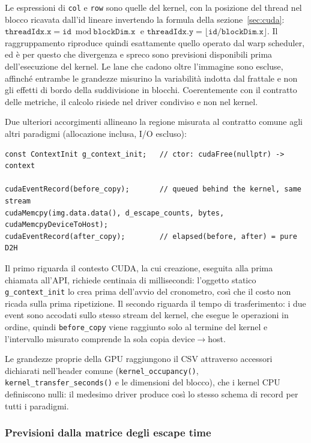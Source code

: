 Le espressioni di \texttt{col} e \texttt{row} sono quelle del kernel, con la
posizione del thread nel blocco ricavata dall'id lineare invertendo la formula
della sezione~\ref{sec:cuda}: $\texttt{threadIdx.x} = \texttt{id} \bmod
\texttt{blockDim.x}$ e $\texttt{threadIdx.y} = \lfloor \texttt{id} /
\texttt{blockDim.x} \rfloor$. Il raggruppamento riproduce quindi esattamente
quello operato dal warp scheduler, ed è per questo che divergenza e spreco sono
previsioni disponibili prima dell'esecuzione del kernel. Le lane che cadono oltre
l'immagine sono escluse, affinché entrambe le grandezze misurino la variabilità
indotta dal frattale e non gli effetti di bordo della suddivisione in blocchi.
Coerentemente con il contratto delle metriche, il calcolo risiede nel driver
condiviso e non nel kernel.

Due ulteriori accorgimenti allineano la regione misurata al contratto comune agli
altri paradigmi (allocazione inclusa, I/O escluso):

\begin{verbatim}
const ContextInit g_context_init;   // ctor: cudaFree(nullptr) -> context

cudaEventRecord(before_copy);       // queued behind the kernel, same stream
cudaMemcpy(img.data.data(), d_escape_counts, bytes, cudaMemcpyDeviceToHost);
cudaEventRecord(after_copy);        // elapsed(before, after) = pure D2H
\end{verbatim}

Il primo riguarda il contesto CUDA, la cui creazione, eseguita alla prima
chiamata all'API, richiede centinaia di millisecondi: l'oggetto statico
\texttt{g\_context\_init} lo crea prima dell'avvio del cronometro, così che il
costo non ricada sulla prima ripetizione. Il secondo riguarda il tempo di
trasferimento: i due event sono accodati sullo stesso stream del kernel, che
esegue le operazioni in ordine, quindi \texttt{before\_copy} viene raggiunto solo
al termine del kernel e l'intervallo misurato comprende la sola copia
device$\to$host.

Le grandezze proprie della GPU raggiungono il CSV attraverso accessori dichiarati
nell'header comune (\texttt{kernel\_occupancy()},
\texttt{kernel\_transfer\_seconds()} e le dimensioni del blocco), che i kernel
CPU definiscono nulli: il medesimo driver produce così lo stesso schema di record
per tutti i paradigmi.

\subsubsection{Previsioni dalla matrice degli escape time}
\label{sec:cuda-previsioni}

